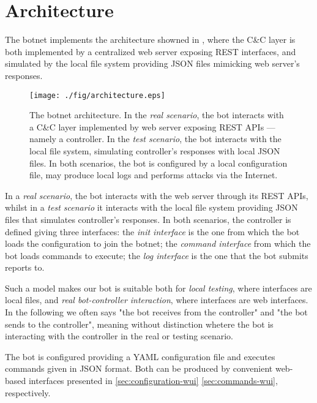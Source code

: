 \section{Architecture}
\label{sec:architecture}

The botnet implements the architecture showned in , where the C\&C layer is both implemented by a centralized web server exposing REST interfaces, and simulated by the local file system providing JSON files mimicking web server's responses.

\begin{figure}[tp]
  \centering
  \texttt{[image: ./fig/architecture.eps]}
  \caption{The botnet architecture. In the \textit{real scenario}, the bot interacts with a C\&C layer implemented by web server exposing REST APIs — namely a controller. In the \textit{test scenario}, the bot interacts with the local file system, simulating controller's responses with local JSON files. In both scenarios, the bot is configured by a local configuration file, may produce local logs and performs attacks via the Internet.}
    \label{fig:botnet-architecture}
\end{figure}

In a \textit{real scenario}, the bot interacts with the web server through its REST APIs, whilst in a \textit{test scenario} it interacts with the local file system providing JSON files that simulates controller's responses.
In both scenarios, the controller is defined giving three interfaces: the \textit{init interface} is the one from which the bot loads the configuration to join the botnet; the \textit{command interface} from which the bot loads commands to execute; the \textit{log interface} is the one that the bot submits reports to.

Such a model makes our bot is suitable both for \textit{local testing}, where interfaces are local files, and \textit{real bot-controller interaction}, where interfaces are web interfaces.
In the following we often says "the bot receives from the controller" and "the bot sends to the controller", meaning without distinction whetere the bot is interacting with the controller in the real or testing scenario.

The bot is configured providing a YAML configuration file and executes commands given in JSON format. Both can be produced by convenient web-based interfaces presented in \ref{sec:configuration-wui} \ref{sec:commands-wui}, respectively.
